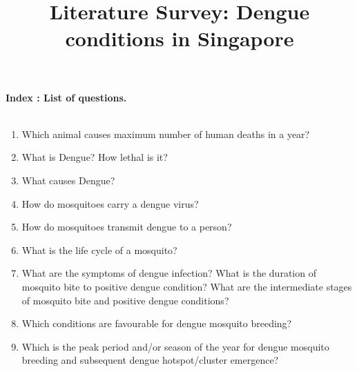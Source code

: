 \documentclass[11pt]{exam}
\begin{document}
\title{\textbf{Literature Survey: Dengue conditions in Singapore}}
\maketitle
\textbf{Index : List of questions.} \\ \\

\begin{enumerate}
\item{}Which animal causes maximum number of human deaths in a year? \\ 
\item{}What is Dengue? How lethal is it? \\ 
\item{} What causes Dengue?  \\ 
\item{} How do mosquitoes carry a dengue virus? \\ 
\item{} How do mosquitoes transmit dengue to a person? \\ %
\item{} What is the life cycle of a mosquito?  \\ 
\item{} What are the symptoms of dengue infection? What is the duration of mosquito bite to positive dengue condition? What are the intermediate stages of mosquito bite and positive dengue conditions?\\
\item{} Which conditions are favourable for dengue mosquito breeding?\\ %
\item{} Which is the peak period and/or season of the year for dengue mosquito breeding and subsequent dengue hotspot/cluster emergence? \\ %

\end{enumerate}
\end{document}
